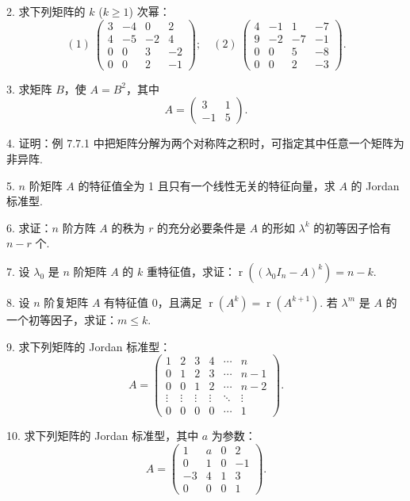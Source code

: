 \documentclass[UTF8, 12pt, fontset=fandol, oneside]{ctexart}
\begin{document}
2. 求下列矩阵的 $k$ ($k\geq 1$) 次幂：
\[
(1)\ \left(\begin{array}{rrrr}
3 & -4 & 0 & 2\\
4 & -5 & -2 & 4\\
0 & 0 & 3 & -2\\
0 & 0 & 2 & -1
\end{array}\right);\quad
(2)\ \left(\begin{array}{rrrr}
4 & -1 & 1 & -7\\
9 & -2 & -7 & -1\\
0 & 0 & 5 & -8\\
0 & 0 & 2 & -3
\end{array}\right).
\]

3. 求矩阵 $B$，使 $A=B^2$，其中
\[
A=\left(\begin{array}{rr}
3 & 1\\
-1 & 5
\end{array}\right).
\]

4. 证明：例 7.7.1 中把矩阵分解为两个对称阵之积时，可指定其中任意一个矩阵为非异阵.

5. $n$ 阶矩阵 $A$ 的特征值全为 1 且只有一个线性无关的特征向量，求 $A$ 的 Jordan 标准型.

6. 求证：$n$ 阶方阵 $A$ 的秩为 $r$ 的充分必要条件是 $A$ 的形如 $\lambda^k$ 的初等因子恰有 $n-r$ 个.

7. 设 $\lambda_0$ 是 $n$ 阶矩阵 $A$ 的 $k$ 重特征值，求证：$\operatorname{r}((\lambda_0I_n-A)^k)=n-k$.

8. 设 $n$ 阶复矩阵 $A$ 有特征值 0，且满足 $\operatorname{r}(A^k)=\operatorname{r}(A^{k+1})$. 若 $\lambda^m$ 是 $A$ 的一个初等因子，求证：$m\leq k$.

9. 求下列矩阵的 Jordan 标准型：
\[
A=\left(\begin{array}{cccccc}
1 & 2 & 3 & 4 & \cdots & n\\
0 & 1 & 2 & 3 & \cdots & n-1\\
0 & 0 & 1 & 2 & \cdots & n-2\\
\vdots & \vdots & \vdots & \vdots & \ddots & \vdots\\
0 & 0 & 0 & 0 & \cdots & 1
\end{array}\right).
\]

10. 求下列矩阵的 Jordan 标准型，其中 $a$ 为参数：
\[
A=\left(\begin{array}{rrrr}
1 & a & 0 & 2\\
0 & 1 & 0 & -1\\
-3 & 4 & 1 & 3\\
0 & 0 & 0 & 1
\end{array}\right).
\]
\end{document}
